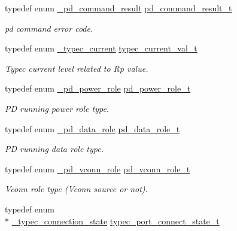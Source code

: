 \begin{DoxyCompactItemize}
typedef enum \hyperlink{group__usb__pd__stack_gaa0c9fbfbfb4442ef9d805438bfeb045c}{\-\_\-pd\-\_\-command\-\_\-result} \hyperlink{group__usb__pd__stack_ga59917b1485caba4dd8d9b65ca5a5fd92}{pd\-\_\-command\-\_\-result\-\_\-t}
\begin{DoxyCompactList}\small\item\em pd command error code. \end{DoxyCompactList}\item 
typedef enum \hyperlink{group__usb__pd__stack_gaf956bb4d3d27df52fb694311b8219b0e}{\-\_\-typec\-\_\-current} \hyperlink{group__usb__pd__stack_ga875b585c994b83a1c1fd1e81bac28f7a}{typec\-\_\-current\-\_\-val\-\_\-t}
\begin{DoxyCompactList}\small\item\em Typec current level related to Rp value. \end{DoxyCompactList}\item 
typedef enum \hyperlink{group__usb__pd__stack_ga46146487374ddc31d48f33b2b6a26f8b}{\-\_\-pd\-\_\-power\-\_\-role} \hyperlink{group__usb__pd__stack_ga19f0723d5c2d772a03d075636497183f}{pd\-\_\-power\-\_\-role\-\_\-t}
\begin{DoxyCompactList}\small\item\em P\-D running power role type. \end{DoxyCompactList}\item 
typedef enum \hyperlink{group__usb__pd__stack_ga25760887aa95821023cc0ab5e151f828}{\-\_\-pd\-\_\-data\-\_\-role} \hyperlink{group__usb__pd__stack_gabe6e64840f66187fd82dca3d81259839}{pd\-\_\-data\-\_\-role\-\_\-t}
\begin{DoxyCompactList}\small\item\em P\-D running data role type. \end{DoxyCompactList}\item 
typedef enum \hyperlink{group__usb__pd__stack_gab67908aebf6cb10704f4ec6127761e28}{\-\_\-pd\-\_\-vconn\-\_\-role} \hyperlink{group__usb__pd__stack_ga1e7a5e660ff0837fe23286556a20d4eb}{pd\-\_\-vconn\-\_\-role\-\_\-t}
\begin{DoxyCompactList}\small\item\em Vconn role type (Vconn source or not). \end{DoxyCompactList}\item 
typedef enum \\*
\hyperlink{group__usb__pd__stack_ga5dcf4d70a373001cfde169f0e8b9a1ba}{\-\_\-typec\-\_\-connection\-\_\-state} \hyperlink{group__usb__pd__stack_ga416d720fe603166cb1c16443199d42f8}{typec\-\_\-port\-\_\-connect\-\_\-state\-\_\-t}

\end{DoxyCompactItemize}
